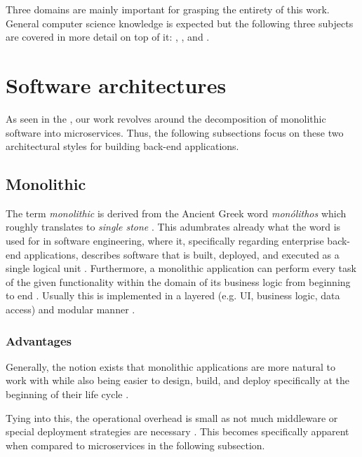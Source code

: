 \documentclass[12pt,a4paper]{report}
\begin{document}
Three domains are mainly important for grasping the entirety of this work.
General computer science knowledge is expected but the following three subjects
are covered in more detail on top of it: \textit{},
\textit{}, and
\textit{}.



\section{Software architectures} \label{sect:background-architecture}

As seen in the \textit{}, our work revolves around
the decomposition of monolithic software into microservices. Thus, the
following subsections focus on these two architectural styles for building
back\hyp end applications.


\subsection{Monolithic}

The term \textit{monolithic} is derived from the Ancient Greek word \textit{
monólithos} which roughly translates to \textit{single stone}
\cite{press2011oxford}. This adumbrates already what the word is used for in software
engineering, where it, specifically regarding enterprise back-end applications,
describes software that is built, deployed, and executed as a single logical
unit \cite{ms-fowler}. Furthermore, a monolithic application can perform every
task of the given functionality within the domain of its business logic from
beginning to end \cite{monolith}. Usually this is implemented in a layered
(e.g. UI, business logic, data access) and modular manner \cite{ms-fowler, monolith}.

\subsubsection{Advantages} Generally, the notion exists that monolithic
applications are more natural to work with while also being easier to design,
build, and deploy specifically at the beginning of their life cycle
\cite{ms-fowler, raymond2003unix}.

Tying into this, the operational overhead is small as not much middleware or
special deployment strategies are necessary \cite{ms-fowler}. This becomes
specifically apparent when compared to microservices in the following
subsection.
\end{document}
